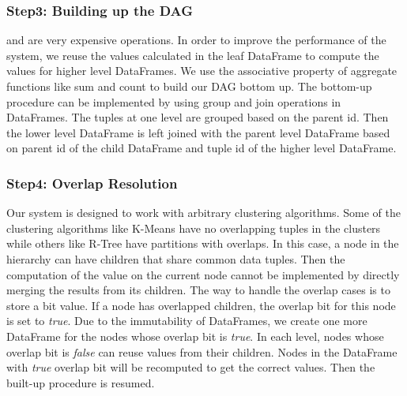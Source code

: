 \subsubsection{Step3: Building up the DAG}
{\aggravation} and {\intervention} are very expensive operations. 
In order to improve the performance of the system, we reuse the values calculated in the leaf DataFrame to compute the values for higher level DataFrames. 
We use the associative property of aggregate functions like sum and count to build our DAG bottom up. 
The bottom-up procedure can be implemented by using group and join operations in DataFrames. 
The tuples at one level are grouped based on the parent id.  
Then the lower level DataFrame is left joined with the parent level DataFrame based on parent id of the child DataFrame and tuple id of the higher level DataFrame. 

\subsubsection{Step4: Overlap Resolution}
Our system is designed to work with arbitrary clustering algorithms. 
Some of the clustering algorithms like K-Means have no overlapping tuples in the clusters while others like R-Tree have partitions with overlaps. 
In this case, a node in the hierarchy can have children that share common data tuples. 
Then the computation of the value on the current node cannot be implemented by directly merging the results from its children. 
The way to handle the overlap cases is to store a bit value.
If a node has overlapped children, the overlap bit for this node is set to \emph{true}. 
Due to the immutability of DataFrames, we create one more DataFrame for the nodes whose overlap bit is \emph{true}. 
In each level, nodes whose overlap bit is \emph{false} can reuse values from their children. Nodes in the DataFrame with \emph{true} overlap bit will be recomputed to get the correct values. 
Then the built-up procedure is resumed. 

